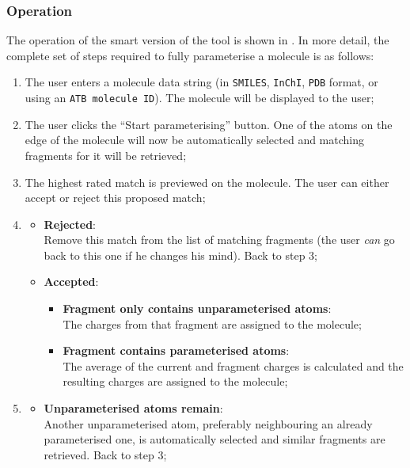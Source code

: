 \subsubsection{Operation}
The operation of the smart version of the tool is shown in . In more detail, the complete set of steps required to fully parameterise a molecule is as follows:
\begin{enumerate}[itemsep=.1em, parsep=.2em, topsep=0em]
\item The user enters a molecule data string (in \verb|SMILES|, \verb|InChI|, \verb|PDB| format, or using an \verb|ATB molecule ID|). The molecule will be displayed to the user;
\item The user clicks the ``Start parameterising'' button. One of the atoms on the edge of the molecule will now be automatically selected and matching fragments for it will be retrieved;
\item The highest rated match is previewed on the molecule. The user can either accept or reject this proposed match;
\item
  \begin{itemize}[leftmargin=0cm, itemsep=.1em, parsep=.1em]
  \item[]{\bf Rejected}:\\Remove this match from the list of matching fragments (the user \emph{can} go back to this one if he changes his mind). Back to step 3;
  \item[] {\bf Accepted}:
    \begin{itemize}[leftmargin=.5cm, itemsep=.1em, parsep=.1em]
    \item[] {\bf Fragment only contains unparameterised atoms}:\\
      The charges from that fragment are assigned to the molecule;
    \item[]{\bf Fragment contains parameterised atoms}:\\
      The average of the current and fragment charges is calculated and the resulting charges are assigned to the molecule;
    \end{itemize}
  \end{itemize}
\item
  \begin{itemize}[leftmargin=0cm, itemsep=.1em, parsep=.1em]
  \item[]{\bf Unparameterised atoms remain}:\\Another unparameterised atom, preferably neighbouring an already parameterised one, is automatically selected and similar fragments are retrieved. Back to step 3;

\end{itemize}
\end{enumerate}
